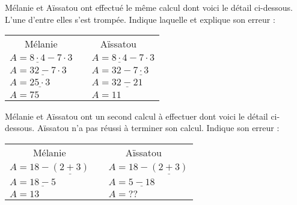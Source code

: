 
\begin{activite}

 \begin{partie}
Mélanie et Aïssatou ont effectué le même calcul dont voici le détail ci-dessous. L'une d'entre elles s'est trompée. Indique laquelle et explique son erreur :

\vspace{1em}

\begin{center}
 \begin{tabularx}{.6\linewidth}{X|cX}
  \multicolumn{1}{c|}{Mélanie} & \multicolumn{2}{c}{Aïssatou} \\
  $A = \underline{8 \cdot 4} - 7 \cdot 3$ && $A = \underline{8 \cdot 4} - 7 \cdot 3$ \\
  $A = \underline{32 - 7} \cdot 3$ && $A = 32 - \underline{7 \cdot 3}$ \\
  $A = \underline{25 \cdot 3}$ && $A = \underline{32 - 21}$ \\
  $A = 75$ && $A = 11$ \\
  \end{tabularx}
\end{center}

\end{partie}


\begin{partie}
Mélanie et Aïssatou ont un second calcul à effectuer dont voici le détail ci-dessous. Aïssatou n'a pas réussi à terminer son calcul. Indique son erreur :

\vspace{1em}

\begin{center}
 \begin{tabularx}{.6\linewidth}{X|cX}
  \multicolumn{1}{c|}{Mélanie} & \multicolumn{2}{c}{Aïssatou} \\
  $A = 18 - \underline{(2 + 3)}$ && $A = 18 - \underline{(2 + 3)}$ \\
  $A = \underline{18 - 5}$ && $A = \underline{5 - 18}$ \\
  $A = 13$ && $A = ??$ \\
  \end{tabularx}
\end{center}

\end{partie}

\end{activite}


